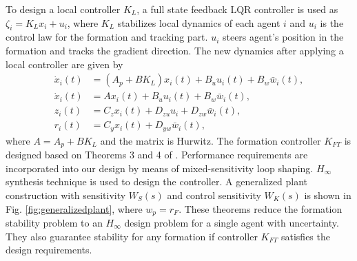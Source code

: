 To design a local controller $K_L$, a full state feedback LQR controller is used as  $\zeta_i=K_Lx_i +u_i$, where $K_L$ stabilizes local dynamics of each agent $i$ and $u_i$ is the control law for the formation and tracking part. $u_i$ steers agent's position in the formation and tracks the gradient direction. The new dynamics after applying a local controller are given by
\begin{align}\label{eq:lct_LTImodelstable}
\dot{x}_i(t) & = (A_p + BK_L)x_i(t) + B_u u_i(t) + B_w \bar{w}_i(t),\nonumber \\
\dot{x}_i(t) & = Ax_i(t) + B_u u_i(t) + B_w \bar{w}_i(t),\nonumber \\
z_i(t) & =  C_z x_i (t) + D_{zu}u_i + D_{zw} \bar{w}_i(t), \nonumber \\
r_i(t) & =  C_y x_i (t) + D_{yw} \bar{w}_i(t),
\end{align}
where $A=A_p+BK_L$ and the matrix is Hurwitz.
The formation controller $K_{FT}$ is designed based on Theorems 3 and 4 of \citep{PilzPopovWerner09}. Performance requirements are incorporated into our design by means of  mixed-sensitivity loop shaping.  $H_{\infty}$ synthesis technique is used to design the controller.  A generalized plant construction with sensitivity $W_S(s)$ and control sensitivity $W_K(s)$ is shown in Fig. \ref{fig:generalizedplant}, where $w_p=r_{F}$.
These theorems reduce the formation stability problem to an $H_{\infty}$ design problem for a single agent with uncertainty. They also guarantee stability for any formation  if controller $K_{FT}$ satisfies the design requirements.


%


